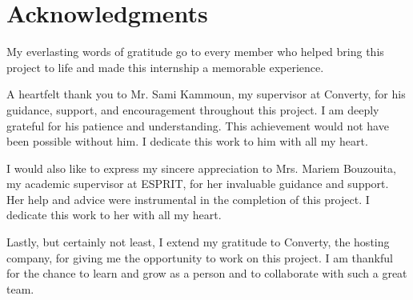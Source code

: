 \chapter*{Acknowledgments}

My everlasting words of gratitude go to every member who helped bring this project to life and made this internship a memorable experience.
\newline

\noindent A heartfelt thank you to Mr. Sami Kammoun, my supervisor at Converty, for his guidance, support, and encouragement throughout this project. I am deeply grateful for his patience and understanding. This achievement would not have been possible without him. I dedicate this work to him with all my heart.
\newline

\noindent I would also like to express my sincere appreciation to Mrs. Mariem Bouzouita, my academic supervisor at ESPRIT, for her invaluable guidance and support. Her help and advice were instrumental in the completion of this project. I dedicate this work to her with all my heart.
\newline

\noindent Lastly, but certainly not least, I extend my gratitude to Converty, the hosting company, for giving me the opportunity to work on this project. I am thankful for the chance to learn and grow as a person and to collaborate with such a great team.